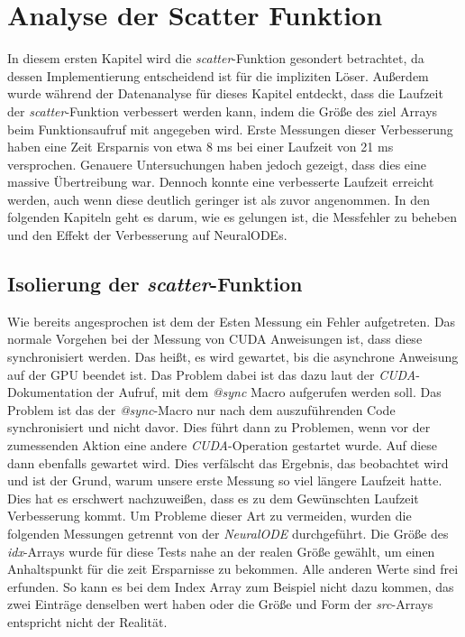 
\section{Analyse der Scatter Funktion}

In diesem ersten Kapitel wird die \textit{scatter}-Funktion gesondert betrachtet, da
dessen Implementierung entscheidend ist für die impliziten Löser.
Außerdem wurde während der Datenanalyse für dieses Kapitel entdeckt,
dass die Laufzeit der \textit{scatter}-Funktion verbessert werden kann, 
indem die Größe des ziel Arrays beim Funktionsaufruf mit angegeben wird.
Erste Messungen dieser Verbesserung haben eine Zeit Ersparnis von etwa 8 ms bei einer Laufzeit von 21 ms 
versprochen.
Genauere Untersuchungen haben jedoch gezeigt, dass dies eine massive Übertreibung war.
Dennoch konnte eine verbesserte Laufzeit erreicht werden, auch wenn diese deutlich geringer ist als zuvor angenommen.
In den folgenden Kapiteln geht es darum, wie es gelungen ist, die Messfehler zu beheben und den Effekt der Verbesserung auf NeuralODEs.


\subsection{Isolierung der \textit{scatter}-Funktion}

Wie bereits angesprochen ist dem der Esten Messung ein Fehler aufgetreten.
Das normale Vorgehen bei der Messung von CUDA Anweisungen ist, 
dass diese synchronisiert werden.
Das heißt, es wird gewartet, bis die asynchrone Anweisung auf der GPU beendet ist.
Das Problem dabei ist das dazu laut der \textit{CUDA}-Dokumentation der Aufruf, mit dem \textit{@sync} Macro aufgerufen werden soll.
Das Problem ist das der \textit{@sync}-Macro nur nach dem auszuführenden Code synchronisiert und nicht davor.
Dies führt dann zu Problemen, wenn vor der zumessenden Aktion eine andere \textit{CUDA}-Operation gestartet wurde.
Auf diese dann ebenfalls gewartet wird. 
Dies verfälscht das Ergebnis, das beobachtet wird und ist der Grund, warum unsere erste Messung so viel längere Laufzeit hatte.
Dies hat es erschwert nachzuweißen, dass es zu dem Gewünschten Laufzeit Verbesserung kommt.
Um Probleme dieser Art zu vermeiden, wurden die folgenden Messungen getrennt von der \textit{NeuralODE} durchgeführt.
Die Größe des \textit{idx}-Arrays wurde für diese Tests nahe an der realen Größe gewählt, um einen Anhaltspunkt für die zeit Ersparnisse zu bekommen.
Alle anderen Werte sind frei erfunden.
So kann es bei dem Index Array zum Beispiel nicht dazu kommen, 
das zwei Einträge denselben wert haben oder die Größe und Form der \textit{src}-Arrays entspricht nicht der Realität.

